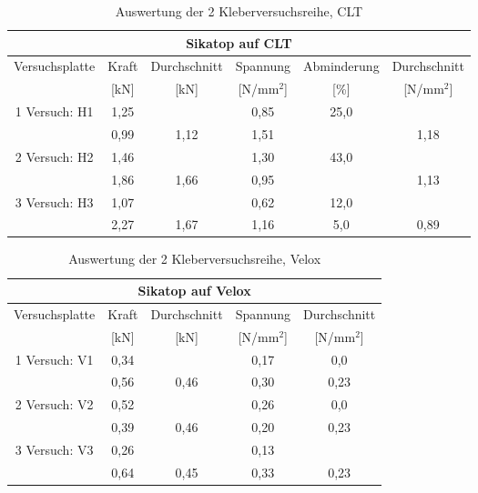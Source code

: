 \documentclass[12 pt,a4 paper ]{scrreprt}
\begin{document}
\begin{table}
\caption{Auswertung der 2 Kleberversuchsreihe, CLT}
\begin{tabular}{|c|c|c|c|c|c|} \hline
\multicolumn{6}{|c|}{Sikatop auf CLT} \\\hline
Versuchsplatte & Kraft & Durchschnitt & Spannung & Abminderung & Durchschnitt \\
	& [kN] & [kN] & [N/mm$^{2}$] & [\%] & [N/mm$^{2}$] \\
	\hline\hline
\cline{2-2} 1 Versuch: H1  & 1,25 & & 0,85& 25,0& \\\cline{2-2}&0,99 & 1,12 &1,51 & & 1,18
\\\hline\hline

\cline{2-2} 2 Versuch: H2  & 1,46 & & 1,30& 43,0& \\\cline{2-2}&1,86 & 1,66 &0,95 & & 1,13
\\\hline\hline

\cline{2-2} 3 Versuch: H3 & 1,07 & & 0,62&12,0 & \\\cline{2-2}&2,27 &1,67 &1,16 & 5,0 & 0,89 
\\\hline

\end{tabular}
 \label{tab:2.1 kleberversuche}
 \end{table}

\begin{table}
\caption{Auswertung der 2 Kleberversuchsreihe, Velox}
\begin{center}


\begin{tabular}{|c|c|c|c|c|} \hline
\multicolumn{5}{|c|}{Sikatop auf Velox} \\\hline
Versuchsplatte & Kraft & Durchschnitt & Spannung & Durchschnitt \\
	& [kN] & [kN] & [N/mm$^{2}$] & [N/mm$^{2}$] \\
	\hline\hline
\cline{2-2} 1 Versuch: V1  & 0,34 & & 0,17& 0,0 \\\cline{2-2}&0,56 & 0,46 &0,30 &0,23
\\\hline\hline

\cline{2-2} 2 Versuch: V2  & 0,52 & & 0,26 & 0,0 \\\cline{2-2}&0,39 & 0,46 &0,20 & 0,23
\\\hline\hline

\cline{2-2} 3 Versuch: V3 & 0,26 & & 0,13 & \\\cline{2-2}&0,64 & 0,45 & 0,33 & 0,23  
\\\hline
\end{tabular}

\label{tab:2.2kleberversuche}

\end{center}
\end{table}
\end{document}
